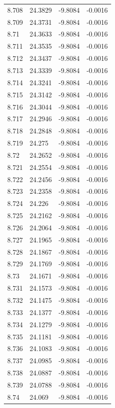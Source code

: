 \begin{tabular}{llll}
8.708 & 24.3829 & -9.8084 & -0.0016 \\
8.709 & 24.3731 & -9.8084 & -0.0016 \\
8.71 & 24.3633 & -9.8084 & -0.0016 \\
8.711 & 24.3535 & -9.8084 & -0.0016 \\
8.712 & 24.3437 & -9.8084 & -0.0016 \\
8.713 & 24.3339 & -9.8084 & -0.0016 \\
8.714 & 24.3241 & -9.8084 & -0.0016 \\
8.715 & 24.3142 & -9.8084 & -0.0016 \\
8.716 & 24.3044 & -9.8084 & -0.0016 \\
8.717 & 24.2946 & -9.8084 & -0.0016 \\
8.718 & 24.2848 & -9.8084 & -0.0016 \\
8.719 & 24.275 & -9.8084 & -0.0016 \\
8.72 & 24.2652 & -9.8084 & -0.0016 \\
8.721 & 24.2554 & -9.8084 & -0.0016 \\
8.722 & 24.2456 & -9.8084 & -0.0016 \\
8.723 & 24.2358 & -9.8084 & -0.0016 \\
8.724 & 24.226 & -9.8084 & -0.0016 \\
8.725 & 24.2162 & -9.8084 & -0.0016 \\
8.726 & 24.2064 & -9.8084 & -0.0016 \\
8.727 & 24.1965 & -9.8084 & -0.0016 \\
8.728 & 24.1867 & -9.8084 & -0.0016 \\
8.729 & 24.1769 & -9.8084 & -0.0016 \\
8.73 & 24.1671 & -9.8084 & -0.0016 \\
8.731 & 24.1573 & -9.8084 & -0.0016 \\
8.732 & 24.1475 & -9.8084 & -0.0016 \\
8.733 & 24.1377 & -9.8084 & -0.0016 \\
8.734 & 24.1279 & -9.8084 & -0.0016 \\
8.735 & 24.1181 & -9.8084 & -0.0016 \\
8.736 & 24.1083 & -9.8084 & -0.0016 \\
8.737 & 24.0985 & -9.8084 & -0.0016 \\
8.738 & 24.0887 & -9.8084 & -0.0016 \\
8.739 & 24.0788 & -9.8084 & -0.0016 \\
8.74 & 24.069 & -9.8084 & -0.0016 \\

\end{tabular}
